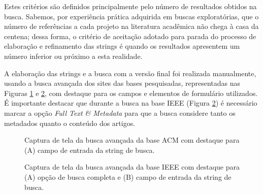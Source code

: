 Estes critérios são definidos principalmente pelo
número de resultados obtidos na busca.
Sabemos, por experiência prática adquirida em buscas exploratórias, 
que o número de referências a cada projeto na
literatura acadêmica não chega à casa da centena; dessa forma, o critério de
aceitação adotado para parada do processo de elaboração e refinamento das strings é
quando os resultados apresentem um número inferior ou próximo a esta realidade.

A elaboração das strings e a busca com a versão final foi
realizada manualmente, usando a busca avançada dos sites das bases pesquisadas,
representadas nas Figuras \ref{advanced-search-acm} e
\ref{advanced-search-ieee}, com destaque para os campos e elementos de formulário
utilizados. É importante destacar que durante a busca na
base IEEE (Figura \ref{advanced-search-ieee}) é necessário marcar a opção {\it Full Text \& Metadata} para que a
busca considere tanto os metadados quanto o conteúdo dos artigos.

\begin{figure}[h]
  \center
  \caption{Captura de tela da busca avançada da base ACM com destaque para (A) campo de entrada da string de busca.}
  \label{advanced-search-acm}
\end{figure}

\begin{figure}[h]
  \center
  \caption{Captura de tela da busca avançada da base IEEE com destaque para (A) opção de busca completa e (B) campo de entrada da string de busca.}
  \label{advanced-search-ieee}
\end{figure}

